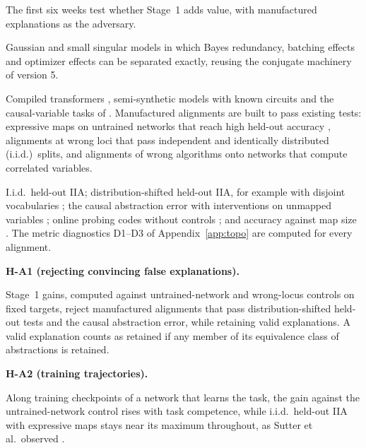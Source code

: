 \documentclass[11pt,a4paper]{article}
\newenvironment{hypbox}[1]{%
  \def\FrameCommand{{\color{chyp}\vrule width 1.6pt}\hspace{8pt}}%
  \MakeFramed{\advance\hsize-\width\FrameRestore}%
  \noindent\textbf{#1}\par\smallskip\noindent\ignorespaces}{\endMakeFramed}
\begin{document}
The first six weeks test whether Stage~1 adds value, with manufactured
explanations as the adversary.
\begin{description}[style=nextline,leftmargin=1.5em]
\item[Exact examples, weeks 1--2.] Gaussian and small singular models in
which Bayes redundancy, batching effects and optimizer effects can be
separated exactly, reusing the conjugate machinery of version 5.
\item[Ground truth and manufactured alignments, weeks 3--4.] Compiled
transformers \cite{tracr2023}, semi-synthetic models with known circuits
\cite{interpbench2024} and the causal-variable tasks of \cite{mib2025}.
Manufactured alignments are built to pass existing tests: expressive maps
on untrained networks that reach high held-out accuracy
\cite{sutter2025}, alignments at wrong loci that pass independent and
identically distributed (i.i.d.)\ splits, and alignments of wrong
algorithms onto networks that compute correlated variables.
\item[Strong baselines on unseen tasks, weeks 5--6.] I.i.d.\ held-out IIA;
distribution-shifted held-out IIA, for example with disjoint vocabularies
\cite{sutter2025}; the causal abstraction error with interventions on
unmapped variables \cite{meloux2026}; online probing codes without controls
\cite{voita2020}; and accuracy against map size \cite{pimentel2020pareto}.
The metric diagnostics D1--D3 of Appendix~\ref{app:topo} are computed for
every alignment.
\end{description}

\begin{hypbox}{H-A1 (rejecting convincing false explanations).}
Stage~1 gains, computed against untrained-network and wrong-locus controls
on fixed targets, reject manufactured alignments that pass
distribution-shifted held-out tests and the causal abstraction error, while
retaining valid explanations. A valid explanation counts as retained if
any member of its equivalence class of abstractions is retained.
\end{hypbox}

\begin{hypbox}{H-A2 (training trajectories).}
Along training checkpoints of a network that learns the task, the gain
against the untrained-network control rises with task competence, while
i.i.d.\ held-out IIA with expressive maps stays near its maximum throughout,
as Sutter et al.\ observed \cite{sutter2025}.
\end{hypbox}
\end{document}
